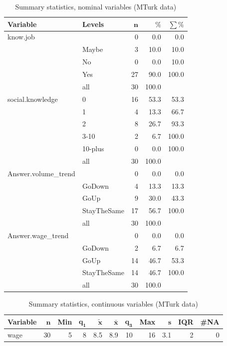 \documentclass[a4paper,10pt]{article}\usepackage[]{graphicx}\usepackage[]{color}
\begin{document}
\begin{table}[ht]
\centering
{\footnotesize
\begin{tabular}{ll|rrr}
 \textbf{Variable} & \textbf{Levels} & $\mathbf{n}$ & $\mathbf{\%}$ & $\mathbf{\sum \%}$ \\ 
  \hline
know.job &  & 0 & 0.0 & 0.0 \\ 
   & Maybe & 3 & 10.0 & 10.0 \\ 
   & No & 0 & 0.0 & 10.0 \\ 
   & Yes & 27 & 90.0 & 100.0 \\ 
   \hline
 & all & 30 & 100.0 &  \\ 
   \hline
\hline
social.knowledge & 0 & 16 & 53.3 & 53.3 \\ 
   & 1 & 4 & 13.3 & 66.7 \\ 
   & 2 & 8 & 26.7 & 93.3 \\ 
   & 3-10 & 2 & 6.7 & 100.0 \\ 
   & 10-plus & 0 & 0.0 & 100.0 \\ 
   \hline
 & all & 30 & 100.0 &  \\ 
   \hline
\hline
Answer.volume\_trend &  & 0 & 0.0 & 0.0 \\ 
   & GoDown & 4 & 13.3 & 13.3 \\ 
   & GoUp & 9 & 30.0 & 43.3 \\ 
   & StayTheSame & 17 & 56.7 & 100.0 \\ 
   \hline
 & all & 30 & 100.0 &  \\ 
   \hline
\hline
Answer.wage\_trend &  & 0 & 0.0 & 0.0 \\ 
   & GoDown & 2 & 6.7 & 6.7 \\ 
   & GoUp & 14 & 46.7 & 53.3 \\ 
   & StayTheSame & 14 & 46.7 & 100.0 \\ 
   \hline
 & all & 30 & 100.0 &  \\ 
   \hline
\hline
\end{tabular}
}
\caption{Summary statistics, nominal variables (MTurk data)} 
\label{tab1:35-9010}
\end{table}
\begin{table}[ht]
\centering
{\footnotesize
\begin{tabular}{lrrrrrrrrrr}
 \textbf{Variable} & $\mathbf{n}$ & \textbf{Min} & $\mathbf{q_1}$ & $\mathbf{\widetilde{x}}$ & $\mathbf{\bar{x}}$ & $\mathbf{q_3}$ & \textbf{Max} & $\mathbf{s}$ & \textbf{IQR} & \textbf{\#NA} \\ 
  \hline
wage & 30 & 5 & 8 & 8.5 & 8.9 & 10 & 16 & 3.1 & 2 & 0 \\ 
  \end{tabular}
}
\caption{Summary statistics, continuous variables (MTurk data)} 
\label{tab2:35-9010}
\end{table}
\end{document}
